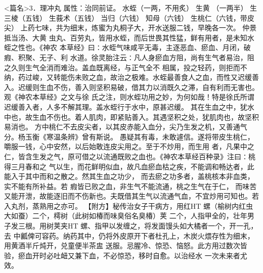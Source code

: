 \documentclass[a4paper,12pt,UTF8,twoside]{ctexbook}
\begin{document}
<篇名>3．理冲丸
属性：治同前证。 
水蛭（一两，不用炙） 生黄 （一两半） 生三棱（五钱） 生莪术（五钱） 当归（六钱） 知母（六钱） 
生桃仁（六钱，带皮尖） 
上药七味，共为细末，炼蜜为丸桐子大，开水送服二钱，早晚各一次。 
仲景抵当汤、大黄 虫丸、百劳丸，皆用水蛭，而后世畏其性猛，鲜有用者，是未知水蛭之性也。《神农 
本草经》曰∶水蛭气味咸平无毒，主逐恶血、瘀血、月闭，破 瘕、积聚、无子、利 
水道。徐灵胎注云∶凡人身瘀血方阻，尚有生气者易治，阻之久则生气全消而难治。盖血既离经，与正气全不 
相属，投之轻药，则拒而不纳，药过峻，又转能伤未败之血，故治之极难。水蛭最善食人之血，而性又迟缓善 
入。迟缓则生血不伤，善入则坚积易破，借其力以消既久之滞，自有利而无害也。观《神农本草经》之文与徐 
氏之注，则水蛭功用之妙，为何如哉！特是徐氏所谓迟缓善入者，人多不解其理。盖水蛭行于水中，原甚迟缓。 
其在生血之中，犹水中也，故生血不伤也。着人肌肉，即紧贴善入。其遇坚积之处，犹肌肉也，故坚积易消也。 
方中桃仁不去皮尖者，以其皮赤能入血分，尖乃生发之机，又善通气分。杨玉衡《寒温条辨》曾有斯说。 
愚疑其有毒，未敢遽信。遂将带皮生桃仁，嚼服一钱，心中安然，以后始敢连皮尖用之。至于不炒用，而生用 
者，凡果中之仁，皆含生发之气，原可借之以流通既败之血也。《神农本草经百种录》注曰∶桃得三月春和之 
气以生，而花鲜明似血，故凡血瘀血枯之疾，不能调和畅达者，此能入于其中而和之散之。然其生血之功少， 
而去瘀之功多者，盖桃核本非血类，实不能有所补益。若 瘕皆已败之血，非生气不能流通，桃之生气在于仁， 
而味苦又能开泄，故能逐旧而不伤新也。夫既借其生气以流通气血，不宜炒用可知也。若入丸剂，蒸熟用之亦可。 
【附方】秘传治女子干病方，用红HT 螺（榆树内红虫大如蚕）二个，樗树（此树如椿而味臭俗名臭椿）荚 
二个，人指甲全的，壮年男子发三根。用树荚夹HT 螺、指甲以发缠之，将发面馒头如大橘者一个，开一孔，去 
中瓤俾可容药。纳药其中，仍将外皮原开下者杜孔上，木炭火煨存性为细末，用黄酒半斤炖开，兑童便半茶盅 
送服。忌腥冷、惊恐、恼怒。此方用过数次皆验，瘀血开时必吐衄又兼下血，不必惊恐，移时自愈。以治经水 
一次未来者尤效。 
\end{document}
